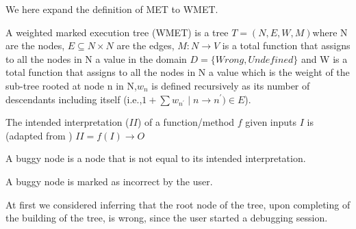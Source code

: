 We here expand the definition of MET \citep{6100055} to WMET.
\begin{definition}
A weighted marked execution tree (WMET) is a tree \(T=(N,E,W,M)\)where N are the nodes,
\(E\subseteq N \times N\)
 are  the edges, \(M:N\to V\) is a total function that assigns to all the nodes in N a value in the domain \(D=\{Wrong,Undefined\}\) and W is a total function that assigns to all the nodes in N a value which is the weight of the sub-tree rooted at node n in N,\(w_n\) is  defined recursively as its number of descendants including itself (i.e.,\(1 + \sum {w_{n^\prime}\mid n \to n^{\prime}) \in E}\)).
\end{definition}
\begin{definition}
The intended interpretation (\(II\)) of a function/method \(f\) given inputs \(I\) is (adapted from \cite{Caballero_adeclarative}) \(II = f(I) \to O\)
\end{definition}
\begin{definition}
A buggy node is a node that is not equal to its intended interpretation.
\end{definition}
A buggy node is marked as incorrect by the user.

At first we considered inferring that the root node of the tree, upon completing of the building of the tree, is wrong, since the user started a debugging session.

